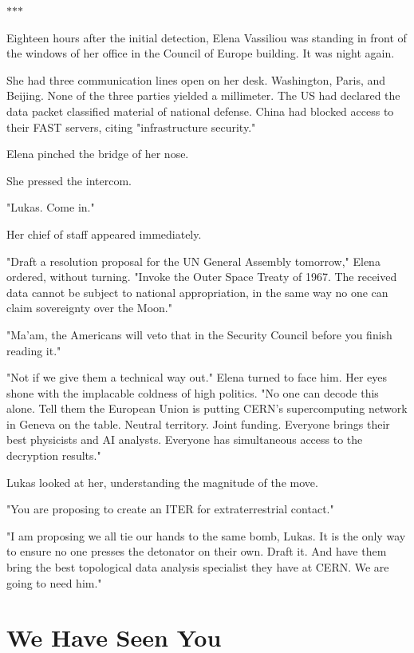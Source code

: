 \documentclass[11pt,a5paper,twoside]{book}
\begin{document}
\vspace{1.5em}
\begin{center}$\ast$\quad$\ast$\quad$\ast$\end{center}
\vspace{1.5em}

Eighteen hours after the initial detection, Elena Vassiliou was standing in front of the windows of her office in the Council of Europe building. It was night again.

She had three communication lines open on her desk. Washington, Paris, and Beijing. None of the three parties yielded a millimeter. The US had declared the data packet classified material of national defense. China had blocked access to their FAST servers, citing "infrastructure security."

Elena pinched the bridge of her nose.

She pressed the intercom.

"Lukas. Come in."

Her chief of staff appeared immediately.

"Draft a resolution proposal for the UN General Assembly tomorrow," Elena ordered, without turning. "Invoke the Outer Space Treaty of 1967. The received data cannot be subject to national appropriation, in the same way no one can claim sovereignty over the Moon."

"Ma'am, the Americans will veto that in the Security Council before you finish reading it."

"Not if we give them a technical way out." Elena turned to face him. Her eyes shone with the implacable coldness of high politics. "No one can decode this alone. Tell them the European Union is putting CERN's supercomputing network in Geneva on the table. Neutral territory. Joint funding. Everyone brings their best physicists and AI analysts. Everyone has simultaneous access to the decryption results."

Lukas looked at her, understanding the magnitude of the move.

"You are proposing to create an ITER for extraterrestrial contact."

"I am proposing we all tie our hands to the same bomb, Lukas. It is the only way to ensure no one presses the detonator on their own. Draft it. And have them bring the best topological data analysis specialist they have at CERN. We are going to need him."

\chapter{We Have Seen You}
\end{document}
